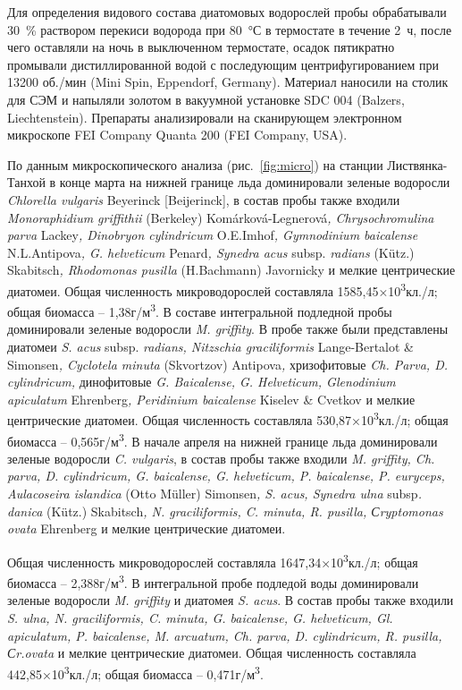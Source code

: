 \documentclass[a4paper,12pt,openany,final]{extreport}
\begin{document}
Для определения видового состава диатомовых водорослей пробы обрабатывали 30~\% раствором перекиси водорода при 80~°С в термостате в течение 2~ч, после чего оставляли на ночь в выключенном термостате, осадок пятикратно промывали дистиллированной водой с последующим центрифугированием при 13200 об./мин (Mini Spin, Eppendorf, Germany). Материал наносили на столик для СЭМ и напыляли золотом в вакуумной установке SDC 004 (Balzers, Liechtenstein). Препараты анализировали на сканирующем электронном микроскопе FEI Company Quanta 200 (FEI Company, USA).


По данным микроскопического анализа (рис.~\ref{fig:micro}) на станции Листвянка-Танхой
в конце марта на нижней границе льда доминировали зеленые водоросли
\emph{Chlorella vulgaris} Beyerinck {[}Beijerinck{]}, в состав пробы
также входили \emph{Monoraphidium griffithii} (Berkeley)
Komárková-Legnerová\emph{, Chrysochromulina parva} Lackey\emph{,
Dinobryon cylindricum} O.E.Imhof\emph{, Gymnodinium baicalense}
N.L.Antipova\emph{, G. helveticum} Penard\emph{, Synedra acus} subsp.
\emph{radians} (Kütz.) Skabitsch\emph{, Rhodomonas pusilla} (H.Bachmann)
Javornicky и мелкие центрические диатомеи. Общая численность
микроводорослей составляла 1585,45×10\textsuperscript{3}кл./л; общая
биомасса -- 1,38г/м\textsuperscript{3}. В составе интегральной подледной
пробы доминировали зеленые водоросли \emph{M. griffity}. В пробе также
были представлены диатомеи \emph{S. acus} subsp. \emph{radians,
Nitzschia graciliformis} Lange-Bertalot \& Simonsen\emph{, Cyclotela
minuta} (Skvortzov) Antipova\emph{,} хризофитовые \emph{Ch. Parva, D.
cylindricum,} динофитовые \emph{G. Baicalense, G. Helveticum,
Glenodinium apiculatum} Ehrenberg\emph{, Peridinium baicalense} Kiselev
\& Cvetkov и мелкие центрические диатомеи. Общая численность составляла
530,87×10\textsuperscript{3}кл./л; общая биомасса --
0,565г/м\textsuperscript{3}. В начале апреля на нижней границе льда
доминировали зеленые водоросли \emph{C. vulgaris}, в состав пробы также
входили \emph{M. griffity, Ch. parva, D. cylindricum, G. baicalense, G.
helveticum, P. baicalense, P. euryceps, Aulacoseira islandica} (Otto
Müller) Simonsen\emph{, S. acus, Synedra ulna} subsp\emph{. danica}
(Kütz.) Skabitsch\emph{, N. graciliformis, C. minuta, R. pusilla,
Сryptomonas ovata} Ehrenberg и мелкие центрические диатомеи.


Общая численность микроводорослей составляла
1647,34×10\textsuperscript{3}кл./л; общая биомасса --
2,388г/м\textsuperscript{3}. В интегральной пробе подледой воды
доминировали зеленые водоросли \emph{M. griffity} и диатомея \emph{S.
acus}. В состав пробы также входили \emph{S. ulna, N. graciliformis, C.
minuta, G. baicalense, G. helveticum, Gl. apiculatum, P. baicalense, M.
arcuatum, Ch. parva, D. cylindricum, R. pusilla, Сr.ovata} и мелкие
центрические диатомеи. Общая численность составляла
442,85×10\textsuperscript{3}кл./л; общая биомасса --
0,471г/м\textsuperscript{3}.
\end{document}
